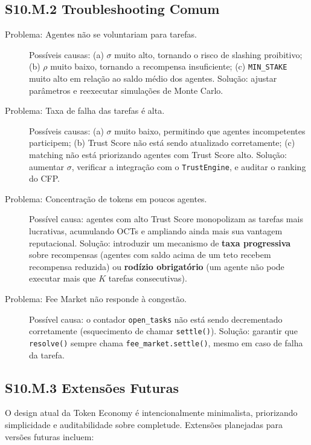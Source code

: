 \subsection*{S10.M.2 Troubleshooting Comum}

\begin{description}
    \item[Problema: Agentes não se voluntariam para tarefas.] Possíveis causas: (a) $\sigma$ muito alto, tornando o risco de slashing proibitivo; (b) $\rho$ muito baixo, tornando a recompensa insuficiente; (c) \texttt{MIN\_STAKE} muito alto em relação ao saldo médio dos agentes. Solução: ajustar parâmetros e reexecutar simulações de Monte Carlo.
    
    \item[Problema: Taxa de falha das tarefas é alta.] Possíveis causas: (a) $\sigma$ muito baixo, permitindo que agentes incompetentes participem; (b) Trust Score não está sendo atualizado corretamente; (c) matching não está priorizando agentes com Trust Score alto. Solução: aumentar $\sigma$, verificar a integração com o \texttt{TrustEngine}, e auditar o ranking do CFP.
    
    \item[Problema: Concentração de tokens em poucos agentes.] Possível causa: agentes com alto Trust Score monopolizam as tarefas mais lucrativas, acumulando OCTs e ampliando ainda mais sua vantagem reputacional. Solução: introduzir um mecanismo de \textbf{taxa progressiva} sobre recompensas (agentes com saldo acima de um teto recebem recompensa reduzida) ou \textbf{rodízio obrigatório} (um agente não pode executar mais que $K$ tarefas consecutivas).
    
    \item[Problema: Fee Market não responde à congestão.] Possível causa: o contador \texttt{open\_tasks} não está sendo decrementado corretamente (esquecimento de chamar \texttt{settle()}). Solução: garantir que \texttt{resolve()} sempre chama \texttt{fee\_market.settle()}, mesmo em caso de falha da tarefa.
\end{description}

\subsection*{S10.M.3 Extensões Futuras}

O design atual da Token Economy é intencionalmente minimalista, priorizando simplicidade e auditabilidade sobre completude. Extensões planejadas para versões futuras incluem:

